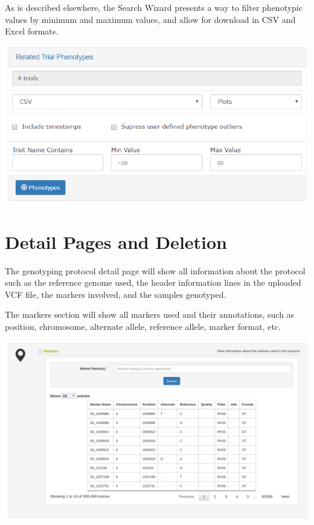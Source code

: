 \documentclass[
  12pt,
]{book}
\begin{document}
As is described elsewhere, the Search Wizard presents a way to filter phenotypic values by minimum and maximum values, and allow for download in CSV and Excel formats.

\begin{center}\includegraphics[width=0.75\linewidth]{assets/images/search_wizard_genotyping_protocols_download_phenotypes} \end{center}

\hypertarget{detail-pages-and-deletion}{%
\section{Detail Pages and Deletion}\label{detail-pages-and-deletion}}

The genotyping protocol detail page will show all information about the protocol such as the reference genome used, the header information lines in the uploaded VCF file, the markers involved, and the samples genotyped.

The markers section will show all markers used and their annotations, such as position, chromosome, alternate allele, reference allele, marker format, etc.

\begin{center}\includegraphics[width=0.95\linewidth]{assets/images/genotyping_protocol_detail_page_markers} \end{center}
\end{document}
